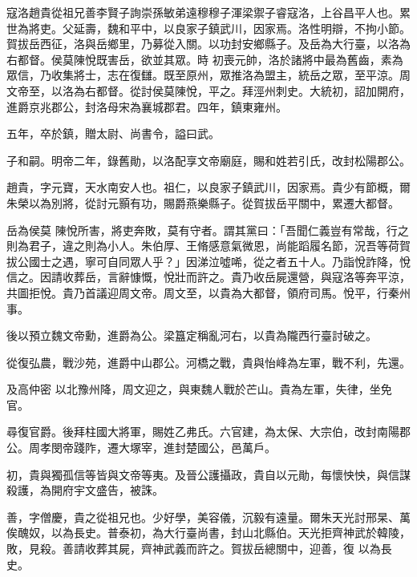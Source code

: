 
\begin{pinyinscope}

 寇洛趙貴從祖兄善李賢子詢崇孫敏弟遠穆穆子渾梁禦子睿寇洛，上谷昌平人也。累世為將吏。父延壽，魏和平中，以良家子鎮武川，因家焉。洛性明辯，不拘小節。賀拔岳西征，洛與岳鄉里，乃募從入關。以功封安鄉縣子。及岳為大行臺，以洛為右都督。侯莫陳悅既害岳，欲並其眾。時
 初喪元帥，洛於諸將中最為舊齒，素為眾信，乃收集將士，志在復讎。既至原州，眾推洛為盟主，統岳之眾，至平涼。周文帝至，以洛為右都督。從討侯莫陳悅，平之。拜涇州刺史。大統初，詔加開府，進爵京兆郡公，封洛母宋為襄城郡君。四年，鎮東雍州。



 五年，卒於鎮，贈太尉、尚書令，謚曰武。



 子和嗣。明帝二年，錄舊勛，以洛配享文帝廟庭，賜和姓若引氏，改封松陽郡公。



 趙貴，字元寶，天水南安人也。祖仁，以良家子鎮武川，因家焉。貴少有節概，爾朱榮以為別將，從討元顥有功，賜爵燕樂縣子。從賀拔岳平關中，累遷大都督。



 岳為侯莫
 陳悅所害，將吏奔敗，莫有守者。謂其黨曰：「吾聞仁義豈有常哉，行之則為君子，違之則為小人。朱伯厚、王脩感意氣微恩，尚能蹈履名節，況吾等荷賀拔公國士之遇，寧可自同眾人乎？」因涕泣噓唏，從之者五十人。乃詣悅詐降，悅信之。因請收葬岳，言辭慷慨，悅壯而許之。貴乃收岳屍還營，與寇洛等奔平涼，共圖拒悅。貴乃首議迎周文帝。周文至，以貴為大都督，領府司馬。悅平，行秦州事。



 後以預立魏文帝勳，進爵為公。梁簋定稱亂河右，以貴為隴西行臺討破之。



 從復弘農，戰沙苑，進爵中山郡公。河橋之戰，貴與怡峰為左軍，戰不利，先還。



 及高仲密
 以北豫州降，周文迎之，與東魏人戰於芒山。貴為左軍，失律，坐免官。



 尋復官爵。後拜柱國大將軍，賜姓乙弗氏。六官建，為太保、大宗伯，改封南陽郡公。周孝閔帝踐阼，遷大塚宰，進封楚國公，邑萬戶。



 初，貴與獨孤信等皆與文帝等夷。及晉公護攝政，貴自以元勛，每懷怏怏，與信謀殺護，為開府宇文盛告，被誅。



 善，字僧慶，貴之從祖兄也。少好學，美容儀，沉毅有遠量。爾朱天光討邢杲、萬俟醜奴，以為長史。普泰初，為大行臺尚書，封山北縣伯。天光拒齊神武於韓陵，敗，見殺。善請收葬其屍，齊神武義而許之。賀拔岳總關中，迎善，復
 以為長史。




\end{pinyinscope}
